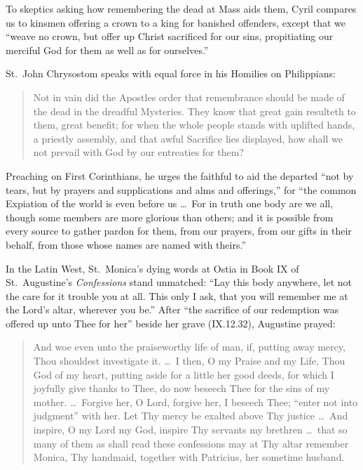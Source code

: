 To skeptics asking how remembering the dead at Mass aids them, Cyril compares us to kinsmen offering a crown to a king for banished offenders, except that we ``weave no crown, but offer up Christ sacrificed for our sins, propitiating our merciful God for them as well as for ourselves.''

St.\ John Chrysostom speaks with equal force in his Homilies on Philippians:

\begin{quote}
Not in vain did the Apostles order that remembrance should be made of the dead in the dreadful Mysteries. They know that great gain resulteth to them, great benefit; for when the whole people stands with uplifted hands, a priestly assembly, and that awful Sacrifice lies displayed, how shall we not prevail with God by our entreaties for them?
\end{quote}

Preaching on First Corinthians, he urges the faithful to aid the departed ``not by tears, but by prayers and supplications and alms and offerings,'' for ``the common Expiation of the world is even before us \dots\ For in truth one body are we all, though some members are more glorious than others; and it is possible from every source to gather pardon for them, from our prayers, from our gifts in their behalf, from those whose names are named with theirs.''

In the Latin West, St.\ Monica's dying words at Ostia in Book IX of St.\ Augustine's \textit{Confessions} stand unmatched: ``Lay this body anywhere, let not the care for it trouble you at all. This only I ask, that you will remember me at the Lord's altar, wherever you be.'' After ``the sacrifice of our redemption was offered up unto Thee for her'' beside her grave (IX.12.32), Augustine prayed:

\begin{quote}
And woe even unto the praiseworthy life of man, if, putting away mercy, Thou shouldest investigate it. \dots\ I then, O my Praise and my Life, Thou God of my heart, putting aside for a little her good deeds, for which I joyfully give thanks to Thee, do now beseech Thee for the sins of my mother. \dots\ Forgive her, O Lord, forgive her, I beseech Thee; ``enter not into judgment'' with her. Let Thy mercy be exalted above Thy justice \dots\ And inspire, O my Lord my God, inspire Thy servants my brethren \dots\ that so many of them as shall read these confessions may at Thy altar remember Monica, Thy handmaid, together with Patricius, her sometime husband.
\end{quote}

